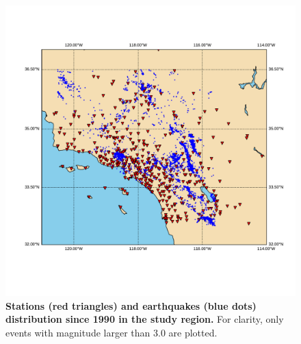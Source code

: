 \documentclass{article} %
\begin{document}

\begin{figure}[ht!]
	\centering
	\includegraphics*[scale=0.4, viewport= -40mm 40mm 500mm 230mm, angle=0]{./figure/stations_events.pdf}
	\caption{{\bf Stations (red triangles) and earthquakes (blue dots) distribution since 1990 in the study region.} For clarity, only events with magnitude larger than 3.0 are plotted.}
	\label{stations_events} %
\end{figure}
\end{document}
